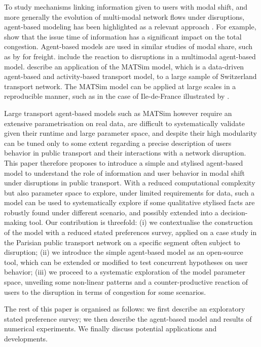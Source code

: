 \documentclass[10pt]{article}
\begin{document}

To study mechanisms linking information given to users with modal shift, and more generally the evolution of multi-modal network flows under disruptions, agent-based modeling has been highlighted as a relevant approach \citep{leng2020role}. For example, \cite{leng2020issue} show that the issue time of information has a significant impact on the total congestion. Agent-based models are used in similar studies of modal share, such as by \cite{baindur2011agent} for freight. \cite{ambra2019should} include the reaction to disruptions in a multimodal agent-based model. \cite{raney2003agent} describe an application of the MATSim model, which is a data-driven agent-based and activity-based transport model, to a large sample of Switzerland transport network. The MATSim model can be applied at large scales in a reproducible manner, such as in the case of Ile-de-France illustrated by \cite{horl2020reproducible}.

Large transport agent-based models such as MATSim however require an extensive parametrisation on real data, are difficult to systematically validate given their runtime and large parameter space, and despite their high modularity can be tuned only to some extent regarding a precise description of users behavior in public transport and their interactions with a network disruption. This paper therefore proposes to introduce a simple and stylised agent-based model to understand the role of information and user behavior in modal shift under disruptions in public transport. With a reduced computational complexity but also parameter space to explore, under limited requirements for data, such a model can be used to systematically explore if some qualitative stylised facts are robustly found under different scenario, and possibly extended into a decision-making tool. Our contribution is threefold: (i) we contextualise the construction of the model with a reduced stated preferences survey, applied on a case study in the Parisian public transport network on a specific segment often subject to disruption; (ii) we introduce the simple agent-based model as an open-source tool, which can be extended or modified to test concurrent hypotheses on user behavior; (iii) we proceed to a systematic exploration of the model parameter space, unveiling some non-linear patterns and a counter-productive reaction of users to the disruption in terms of congestion for some scenarios.

The rest of this paper is organised as follows: we first describe an exploratory stated preference survey; we then describe the agent-based model and results of numerical experiments. We finally discuss potential applications and developments.
\end{document}
